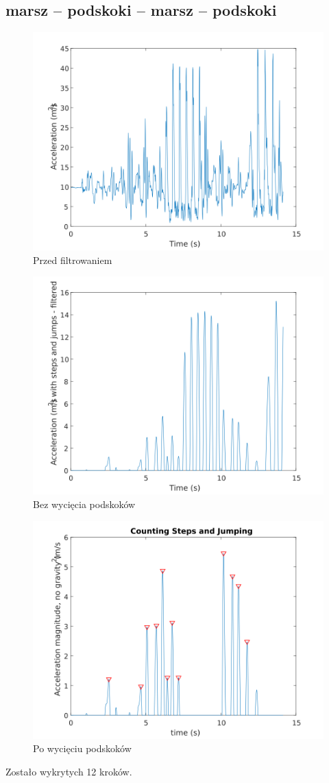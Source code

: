 \documentclass[a4paper, 12pt, titlepage]{article}
\begin{document}
        \subsection{marsz -- podskoki -- marsz -- podskoki}
            \begin{figure}[H]
                \centering
                \includegraphics[width=0.7\columnwidth]
                    {krok_dziala1f.png}
                \caption{Przed filtrowaniem}
            \end{figure}\noindent
            \begin{figure}[H]
                \centering
                \includegraphics[width=0.7\columnwidth]
                    {krok_dziala1a.png}
                \caption{Bez wycięcia podskoków}
            \end{figure}\noindent
            \begin{figure}[H]
                \centering
                \includegraphics[width=0.7\columnwidth]
                    {krok_dziala1b.png}
                \caption{Po wycięciu podskoków}
            \end{figure}\noindent
            Zostało wykrytych 12 kroków.
\end{document}
